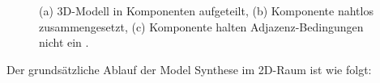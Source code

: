 \documentclass[12pt, a4paper,twoside,openany]{report} %
\begin{document}
\begin{figure}[H]
    \centering
    \qquad
    \qquad
    \caption{(a) 3D-Modell in Komponenten aufgeteilt, (b) Komponente nahtlos zusammengesetzt, (c) Komponente halten Adjazenz-Bedingungen nicht ein \cite{merrell2009model}.}%
\end{figure}

Der grundsätzliche Ablauf der Model Synthese im 2D-Raum ist wie folgt:
\end{document}
